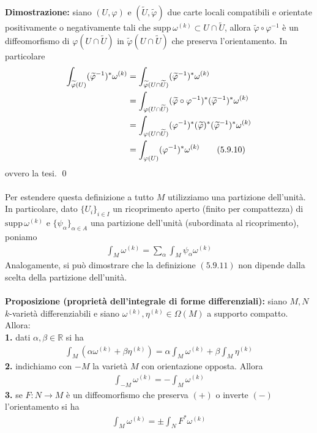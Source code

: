 \documentclass{article}
\begin{document}
\textbf{Dimostrazione:} siano $(U, \varphi)$ e $(\widetilde{U}, \widetilde{\varphi})$ due carte locali compatibili e orientate positivamente o negativamente tali che $\mathrm{supp} \, \omega^{(k)} \subset U \cap \widetilde{U}$, allora $\widetilde{\varphi} \circ \varphi^{-1}$ è un diffeomorfismo di $\varphi(U \cap \widetilde{U})$ in $\widetilde\varphi(U \cap \widetilde{U})$ che preserva l'orientamento. In particolare
\begin{align}
    \int_{\widetilde{\varphi}(U)} (\widetilde{\varphi}^{-1})^*\omega^{(k)} &= \int_{\widetilde{\varphi}(U \cap \widetilde{U})} (\widetilde{\varphi}^{-1})^*\omega^{(k)} \notag \\
    &= \int_{\varphi(U \cap \widetilde{U})} (\widetilde{\varphi} \circ \varphi^{-1})^*(\widetilde{\varphi}^{-1})^*\omega^{(k)} \notag \\
    &= \int_{\varphi(U \cap \widetilde{U})} (\varphi^{-1})^*(\widetilde{\varphi})^*(\widetilde{\varphi}^{-1})^*\omega^{(k)} \notag \\
    &= \int_{\varphi(U)}(\varphi^{-1})^*\omega^{(k)} \tag{5.9.10}
\end{align}
ovvero la tesi. \qed \\ \\
Per estendere questa definizione a tutto $M$ utilizziamo una partizione dell'unità. In particolare, dato $\{U_i\}_{i \in I}$ un ricoprimento aperto (finito per compattezza) di $\mathrm{supp} \, \omega^{(k)}$ e $\{\psi_\alpha\}_{\alpha \in A}$ una partizione dell'unità (subordinata al ricoprimento), poniamo
\begin{align}
    \int_M \omega^{(k)} = \sum_\alpha \int_M \psi_\alpha \omega^{(k)} \tag{5.9.11}
\end{align}
Analogamente, si può dimostrare che la definizione $(5.9.11)$ non dipende dalla scelta della partizione dell'unità. \\ \\
\textbf{Proposizione (proprietà dell'integrale di forme differenziali):} siano $M, N$ $k$-varietà differenziabili e siano $\omega^{(k)}, \eta^{(k)} \in \Omega(M)$ a supporto compatto. Allora: \\
\textbf{1.} dati $\alpha, \beta \in \mathbb{R}$ si ha
\begin{align}
    \int_M (\alpha\omega^{(k)} + \beta\eta^{(k)}) = \alpha\int_M \omega^{(k)} + \beta\int_M \eta^{(k)} \tag{5.9.12}
\end{align}
\textbf{2.} indichiamo con $-M$ la varietà $M$ con orientazione opposta. Allora
\begin{align}
    \int_{-M} \omega^{(k)} = -\int_M \omega^{(k)} \tag{5.9.13}
\end{align}
\textbf{3.} se $F : N \longrightarrow M$ è un diffeomorfismo che preserva $(+)$ o inverte $(-)$ l'orientamento si ha
\begin{align}
    \int_M \omega^{(k)} = \pm\int_{N} F^*\omega^{(k)} \tag{5.9.14}
\end{align} \\
\end{document}
